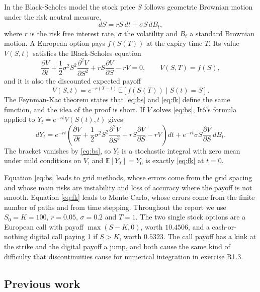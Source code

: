 \documentclass[11pt,a4paper]{article}
\newcommand{\E}{\mathbb{E}}
\begin{document}
In the Black-Scholes model the stock price $S$ follows geometric Brownian motion under the risk neutral measure,
\begin{equation}
dS = rS\,dt + \sigma S\,dB_t, \label{eq:gbm}
\end{equation}
where $r$ is the risk free interest rate, $\sigma$ the volatility and $B_t$ a standard Brownian motion. A European option pays $f(S(T))$ at the expiry time $T$. Its value $V(S,t)$ satisfies the Black-Scholes equation
\begin{equation}
\frac{\partial V}{\partial t} + \frac{1}{2}\sigma^2S^2\frac{\partial^2V}{\partial S^2} + rS\frac{\partial V}{\partial S} - rV = 0, \qquad V(S,T) = f(S), \label{eq:bs}
\end{equation}
and it is also the discounted expected payoff
\begin{equation}
V(S,t) = e^{-r(T-t)}\,\E\left[f(S(T)) \mid S(t) = S\right]. \label{eq:fk}
\end{equation}
The Feynman-Kac theorem states that \eqref{eq:bs} and \eqref{eq:fk} define the same function, and the idea of the proof is short. If $V$ solves \eqref{eq:bs}, It\^o's formula applied to $Y_t = e^{-rt}V(S(t),t)$ gives
\begin{equation}
dY_t = e^{-rt}\left(\frac{\partial V}{\partial t} + \frac{1}{2}\sigma^2S^2\frac{\partial^2V}{\partial S^2} + rS\frac{\partial V}{\partial S} - rV\right)dt + e^{-rt}\sigma S\frac{\partial V}{\partial S}\,dB_t.
\end{equation}
The bracket vanishes by \eqref{eq:bs}, so $Y_t$ is a stochastic integral with zero mean under mild conditions on $V$, and $\E[Y_T] = Y_0$ is exactly \eqref{eq:fk} at $t = 0$.

Equation \eqref{eq:bs} leads to grid methods, whose errors come from the grid spacing and whose main risks are instability and loss of accuracy where the payoff is not smooth. Equation \eqref{eq:fk} leads to Monte Carlo, whose errors come from the finite number of paths and from time stepping. Throughout the report we use $S_0 = K = 100$, $r = 0.05$, $\sigma = 0.2$ and $T = 1$. The two single stock options are a European call with payoff $\max(S - K, 0)$, worth $10.4506$, and a cash-or-nothing digital call paying 1 if $S > K$, worth $0.5323$. The call payoff has a kink at the strike and the digital payoff a jump, and both cause the same kind of difficulty that discontinuities cause for numerical integration in exercise R1.3.

\subsection{Previous work}
\end{document}
